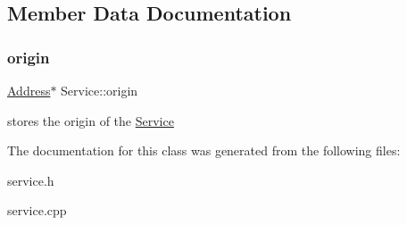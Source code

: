 \subsection{Member Data Documentation}
\mbox{\label{class_service_a4abd0a104d97e5bdb8e8ca93bab31ce7}} 
\subsubsection{\texorpdfstring{origin}{origin}}
{\footnotesize\ttfamily \hyperlink{class_address}{Address}$\ast$ Service\+::origin\hspace{0.3cm}{\ttfamily [protected]}}

stores the origin of the \hyperlink{class_service}{Service} 

The documentation for this class was generated from the following files\+:\begin{DoxyCompactItemize}
\item 
service.\+h\item 
service.\+cpp\end{DoxyCompactItemize}
